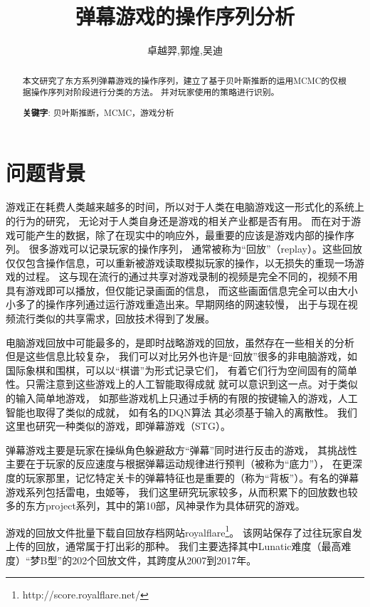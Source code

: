 \documentclass[UTF8]{ctexart}
\title{弹幕游戏的操作序列分析}
\author{卓越羿,郭煌,吴迪}
\begin{document}
\maketitle
\begin{abstract}

本文研究了东方系列弹幕游戏的操作序列，建立了基于贝叶斯推断的运用MCMC的仅根据操作序列对阶段进行分类的方法。
并对玩家使用的策略进行识别。

\textbf{关键字}: 贝叶斯推断，MCMC，游戏分析

\end{abstract}

\section{问题背景}

游戏正在耗费人类越来越多的时间，所以对于人类在电脑游戏这一形式化的系统上的行为的研究，
无论对于人类自身还是游戏的相关产业都是否有用。
而在对于游戏可能产生的数据，除了在现实中的响应外，最重要的应该是游戏内部的操作序列。
很多游戏可以记录玩家的操作序列，
通常被称为“回放”（replay）。这些回放仅仅包含操作信息，可以重新被游戏读取模拟玩家的操作，以无损失的重现一场游戏的过程。
这与现在流行的通过共享对游戏录制的视频是完全不同的，视频不用具有游戏即可以播放，但仅能记录画面的信息，
而这些画面信息完全可以由大小小多了的操作序列通过运行游戏重造出来。早期网络的网速较慢，
出于与现在视频流行类似的共享需求，回放技术得到了发展。

电脑游戏回放中可能最多的，是即时战略游戏的回放，虽然存在一些相关的分析
\cite{starcraft}
但是这些信息比较复杂，
我们可以对比另外也许是“回放”很多的非电脑游戏，如国际象棋和围棋，可以以“棋谱”为形式记录它们，
有着它们行为空间固有的简单性。只需注意到这些游戏上的人工智能取得成就
\cite{alphago}
就可以意识到这一点。对于类似的输入简单地游戏，
如那些游戏机上只通过手柄的有限的按键输入的游戏，人工智能也取得了类似的成就，
如有名的DQN算法
\cite{atari}
其必须基于输入的离散性。
我们这里也研究一种类似的游戏，即弹幕游戏（STG）。

弹幕游戏主要是玩家在操纵角色躲避敌方“弹幕”同时进行反击的游戏，
其挑战性主要在于玩家的反应速度与根据弹幕运动规律进行预判（被称为“底力”），
在更深度的玩家那里，记忆特定关卡的弹幕特征也是重要的（称为“背板”）。有名的弹幕游戏系列包括雷电，虫姬等，
我们这里研究玩家较多，从而积累下的回放数也较多的东方project系列，其中的第10部，风神录作为具体研究的游戏。

游戏的回放文件批量下载自回放存档网站royalflare\footnote{ http://score.royalflare.net/ }。
该网站保存了过往玩家自发上传的回放，通常属于打出彩的那种。
我们主要选择其中Lunatic难度（最高难度）“梦B型”的202个回放文件，其跨度从2007到2017年。
\end{document}
